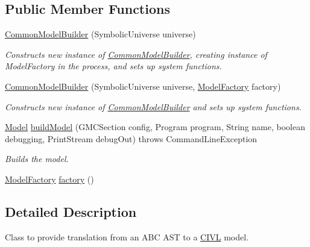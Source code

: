 \subsection*{Public Member Functions}
\begin{DoxyCompactItemize}
\item 
\hyperlink{classedu_1_1udel_1_1cis_1_1vsl_1_1civl_1_1model_1_1common_1_1CommonModelBuilder_ac61336adc1c2a302fdeb55e0e7eed70f}{Common\+Model\+Builder} (Symbolic\+Universe universe)
\begin{DoxyCompactList}\small\item\em Constructs new instance of \hyperlink{classedu_1_1udel_1_1cis_1_1vsl_1_1civl_1_1model_1_1common_1_1CommonModelBuilder}{Common\+Model\+Builder}, creating instance of Model\+Factory in the process, and sets up system functions. \end{DoxyCompactList}\item 
\hyperlink{classedu_1_1udel_1_1cis_1_1vsl_1_1civl_1_1model_1_1common_1_1CommonModelBuilder_a64f3654330b9fbc10728a378aeccee2b}{Common\+Model\+Builder} (Symbolic\+Universe universe, \hyperlink{interfaceedu_1_1udel_1_1cis_1_1vsl_1_1civl_1_1model_1_1IF_1_1ModelFactory}{Model\+Factory} factory)
\begin{DoxyCompactList}\small\item\em Constructs new instance of \hyperlink{classedu_1_1udel_1_1cis_1_1vsl_1_1civl_1_1model_1_1common_1_1CommonModelBuilder}{Common\+Model\+Builder} and sets up system functions. \end{DoxyCompactList}\item 
\hyperlink{interfaceedu_1_1udel_1_1cis_1_1vsl_1_1civl_1_1model_1_1IF_1_1Model}{Model} \hyperlink{classedu_1_1udel_1_1cis_1_1vsl_1_1civl_1_1model_1_1common_1_1CommonModelBuilder_a4ac73b643d0b142fdb0623000f8c25ed}{build\+Model} (G\+M\+C\+Section config, Program program, String name, boolean debugging, Print\+Stream debug\+Out)  throws Command\+Line\+Exception 
\begin{DoxyCompactList}\small\item\em Builds the model. \end{DoxyCompactList}\item 
\hyperlink{interfaceedu_1_1udel_1_1cis_1_1vsl_1_1civl_1_1model_1_1IF_1_1ModelFactory}{Model\+Factory} \hyperlink{classedu_1_1udel_1_1cis_1_1vsl_1_1civl_1_1model_1_1common_1_1CommonModelBuilder_a41c78c1a9c96678525c9777e2bce14f3}{factory} ()
\end{DoxyCompactItemize}


\subsection{Detailed Description}
Class to provide translation from an A\+B\+C A\+S\+T to a \hyperlink{classedu_1_1udel_1_1cis_1_1vsl_1_1civl_1_1CIVL}{C\+I\+V\+L} model. 

